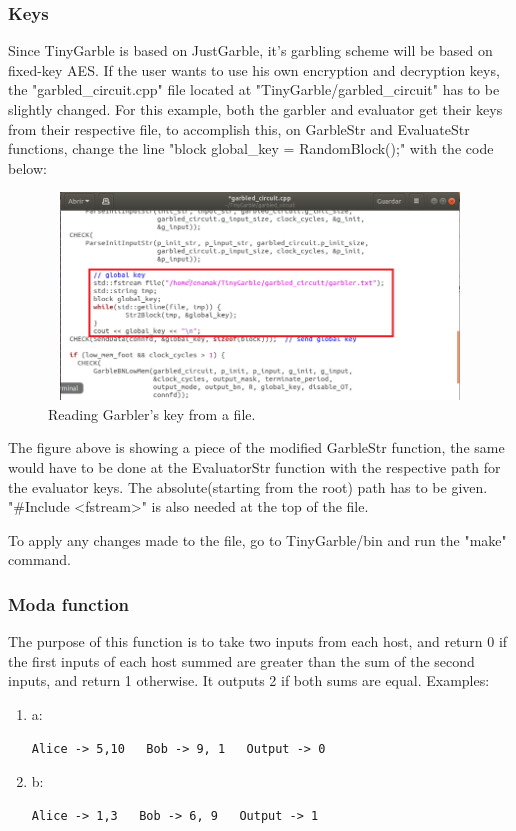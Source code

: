 \begin{refsection}
\subsubsection{Keys}

Since TinyGarble is based on JustGarble, it's garbling scheme will be based on fixed-key AES. If the user wants to use his own encryption and decryption keys, the "garbled\_circuit.cpp" file located at "TinyGarble/garbled\_circuit" has to be slightly changed. For this example, both the garbler and evaluator get their keys from their respective file, to accomplish this, on GarbleStr and EvaluateStr functions, change the line "block global\_key =  RandomBlock();" with the code below:

\begin{figure}[H]
	\centering
	\includegraphics[width=1\textwidth, height=5.5cm]{./sdf/tiny_garble/figures/key_file.png}
    \caption{Reading Garbler's key from a file.}\label{fig:key_file}
\end{figure}

The figure above is showing a piece of the modified GarbleStr function, the same would have to be done at the EvaluatorStr function with the respective path for the evaluator keys. The absolute(starting from the root) path has to be given. "\#Include <fstream>" is also needed at the top of the file. 

To apply any changes made to the file, go to TinyGarble/bin and run the "make" command.

\subsubsection{Moda function}

The purpose of this function is to take two inputs from each host, and return 0 if the first inputs of each host summed are greater than the sum of the second inputs, and return 1 otherwise. It outputs 2 if both sums are equal.
Examples:
\begin{enumerate}
\item a: \begin{lstlisting}[caption={Example of moda inputs and output}, captionpos=b]
Alice -> 5,10   Bob -> 9, 1   Output -> 0
\end{lstlisting}
\item b: \begin{lstlisting}[caption={Example of moda inputs and output}, captionpos=b]
Alice -> 1,3   Bob -> 6, 9   Output -> 1
\end{lstlisting}
\end{enumerate}


\end{refsection}
